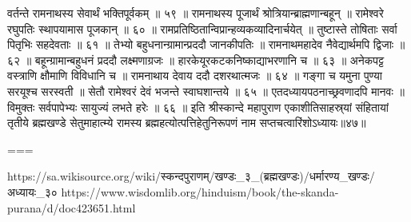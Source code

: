 वर्तन्ते रामनाथस्य सेवार्थं भक्तिपूर्वकम् ॥ ५९ ॥
रामनाथस्य पूजार्थं श्रोत्रियान्ब्राह्मणान्बहून् ॥
रामेश्वरे रघुपतिः स्थापयामास पूजकान् ॥ ६० ॥
रामप्रतिष्ठितान्विप्रान्हव्यकव्यादिनार्चयेत् ॥
तुष्टास्ते तोषिताः सर्वा पितृभिः सहदेवताः ॥ ६१ ॥
तेभ्यो बहुधनान्ग्रामान्प्रददौ जानकीपतिः ॥
रामनाथमहादेव नैवेद्यार्थमपि द्विजाः ॥ ६२ ॥
बहून्ग्रामान्बहुधनं प्रददौ लक्ष्मणाग्रजः ॥
हारकेयूरकटकनिष्काद्याभरणानि च ॥ ६३ ॥
अनेकपट्ट वस्त्राणि क्षौमाणि विविधानि च ॥
रामनाथाय देवाय ददौ दशरथात्मजः ॥ ६४ ॥
गङ्गा च यमुना पुण्या सरयूश्च सरस्वती ॥
सेतौ रामेश्वरं देवं भजन्ते स्वाघशान्तये ॥ ६५ ॥
एतदध्यायपठनाच्छ्रवणादपि मानवः ॥
विमुक्तः सर्वपापेभ्यः सायुज्यं लभते हरेः ॥ ६६ ॥
इति श्रीस्कान्दे महापुराण एकाशीतिसाहस्र्यां संहितायां तृतीये ब्रह्मखण्डे सेतुमाहात्म्ये रामस्य ब्रह्महत्योत्पत्तिहेतुनिरूपणं नाम सप्तचत्वारिंशोऽध्यायः॥४७॥

===

https://sa.wikisource.org/wiki/स्कन्दपुराणम्/खण्डः_३_(ब्रह्मखण्डः)/धर्मारण्य_खण्डः/अध्यायः_३०
https://www.wisdomlib.org/hinduism/book/the-skanda-purana/d/doc423651.html

